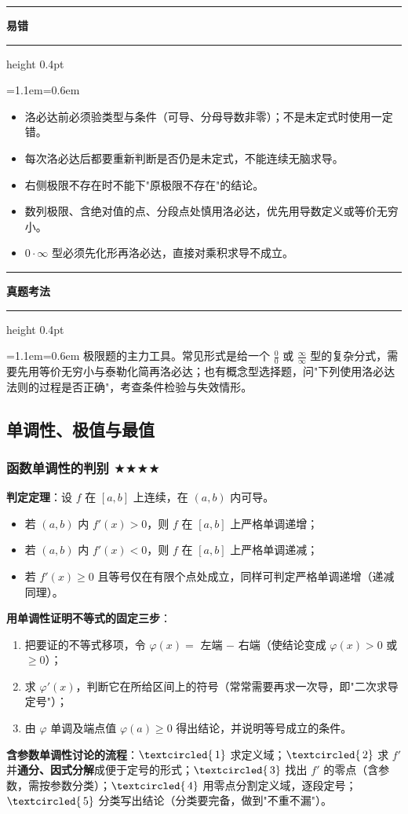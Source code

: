 \documentclass[11pt,openany,UTF8]{ctexbook}
\newcommand{\circled}[1]{\textcircled{\scriptsize\,#1}}
\newcommand{\callouthead}[2]{%
  \par\addvspace{7pt}\noindent
  {\color{#1}\rule[-0.15em]{3pt}{1.05em}}\hspace{0.5em}%
  {\bfseries\color{#1}#2}\par\nobreak\vspace{-0.35em}%
  {\color{rulesep}\hrule height 0.4pt}\nobreak\vspace{0.45em}%
  \begingroup\small\setlength{\parindent}{0pt}%
  \leftskip=1.1em\rightskip=0.6em\noindent\ignorespaces}
\newcommand{\calloutend}{\par\endgroup\addvspace{7pt}}
\newenvironment{callwarn}[1]{\callouthead{warnbar}{#1}}{\calloutend}
\newenvironment{callexam}[1]{\callouthead{exambar}{#1}}{\calloutend}
\begin{document}
\begin{callwarn}{易错}
\begin{itemize}
\item 洛必达前必须验类型与条件（可导、分母导数非零）；不是未定式时使用一定错。
\item 每次洛必达后都要重新判断是否仍是未定式，不能连续无脑求导。
\item 右侧极限不存在时不能下"原极限不存在"的结论。
\item 数列极限、含绝对值的点、分段点处慎用洛必达，优先用导数定义或等价无穷小。
\item $0\cdot\infty$ 型必须先化形再洛必达，直接对乘积求导不成立。
\end{itemize}
\end{callwarn}

\begin{callexam}{真题考法}
极限题的主力工具。常见形式是给一个 $\frac00$ 或 $\frac{\infty}{\infty}$ 型的复杂分式，需要先用等价无穷小与泰勒化简再洛必达；也有概念型选择题，问"下列使用洛必达法则的过程是否正确"，考查条件检验与失效情形。

\end{callexam}

\subsection{单调性、极值与最值}

\subsubsection{函数单调性的判别 $\bigstar$$\bigstar$$\bigstar$$\bigstar$}

\textbf{判定定理}：设 $f$ 在 $[a,b]$ 上连续，在 $(a,b)$ 内可导。

\begin{itemize}
\item 若 $(a,b)$ 内 $f'(x)>0$，则 $f$ 在 $[a,b]$ 上严格单调递增；
\item 若 $(a,b)$ 内 $f'(x)<0$，则 $f$ 在 $[a,b]$ 上严格单调递减；
\item 若 $f'(x)\ge0$ 且等号仅在有限个点处成立，同样可判定严格单调递增（递减同理）。
\end{itemize}
\textbf{用单调性证明不等式的固定三步}：

\begin{enumerate}
\item 把要证的不等式移项，令 $\varphi(x)=$ 左端 $-$ 右端（使结论变成 $\varphi(x)>0$ 或 $\ge0$）；
\item 求 $\varphi'(x)$，判断它在所给区间上的符号（常常需要再求一次导，即"二次求导定号"）；
\item 由 $\varphi$ 单调及端点值 $\varphi(a)\ge0$ 得出结论，并说明等号成立的条件。
\end{enumerate}
\textbf{含参数单调性讨论的流程}：$\circled{1}$ 求定义域；$\circled{2}$ 求 $f'$ 并\textbf{通分、因式分解}成便于定号的形式；$\circled{3}$ 找出 $f'$ 的零点（含参数，需按参数分类）；$\circled{4}$ 用零点分割定义域，逐段定号；$\circled{5}$ 分类写出结论（分类要完备，做到"不重不漏"）。
\end{document}
